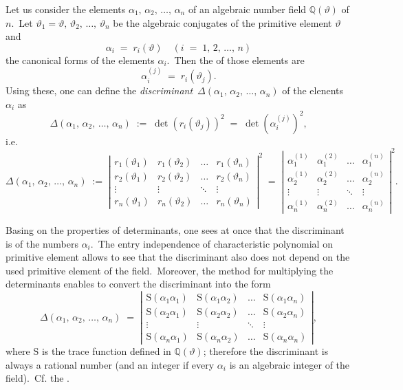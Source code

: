 \documentclass[12pt]{article}
\theoremstyle{definition}
\begin{document}
Let us consider the elements $\alpha_1,\,\alpha_2,\,\ldots,\,\alpha_n$ of an algebraic number field 
$\mathbb{Q}(\vartheta)$ of  $n$.\, Let 
$\vartheta_1 = \vartheta,\,\vartheta_2,\,\ldots,\,\vartheta_n$ be the algebraic conjugates of the primitive element $\vartheta$ and
$$\alpha_i \;=\; r_i(\vartheta) \quad (i \;=\; 1,\,2,\,\ldots,\,n)$$
the canonical forms of the elements $\alpha_i$.\, Then the  of those elements are
$$\alpha_i^{(j)} \;=\; r_i(\vartheta_j).$$
Using these, one can define the \emph{discriminant}\, $\Delta(\alpha_1,\,\alpha_2,\,\ldots,\,\alpha_n)$ of the elenents $\alpha_i$ as
$$\Delta(\alpha_1,\,\alpha_2,\,\ldots,\,\alpha_n) \;:=\; \det(r_i(\vartheta_j))^2 
\;=\; \det\!\left(\alpha_i^{(j)}\right)^2\!,$$
i.e. 
$$\Delta(\alpha_1,\,\alpha_2,\,\ldots,\,\alpha_n) \;:=\;
\left|\begin{array}{cccc}
r_1(\vartheta_1) & r_1(\vartheta_2) &\ldots & r_1(\vartheta_n)\\
r_2(\vartheta_1) & r_2(\vartheta_2) &\ldots & r_2(\vartheta_n)\\
\vdots & \vdots & \ddots & \vdots \\
r_n(\vartheta_1) & r_n(\vartheta_2) &\ldots & r_n(\vartheta_n)
\end{array}\right|^2 \;=\;
\left|\begin{array}{cccc}
\alpha_1^{(1)} & \alpha_1^{(2)} &\ldots & \alpha_1^{(n)}\\
\alpha_2^{(1)} & \alpha_2^{(2)} &\ldots & \alpha_2^{(n)}\\
\vdots & \vdots & \ddots & \vdots \\
\alpha_n^{(1)} & \alpha_n^{(2)} &\ldots & \alpha_n^{(n)}
\end{array}\right|^2\!.
$$

Basing on the properties of determinants, one sees at once that the discriminant is  of the numbers $\alpha_i$.\, The entry independence of characteristic polynomial on primitive element allows to see that the discriminant also does not depend on the used primitive element of the field.\, Moreover, the method for multiplying the determinants enables to convert the discriminant into the form
$$\Delta(\alpha_1,\,\alpha_2,\,\ldots,\,\alpha_n) \;=\;
\left|\begin{array}{cccc}
\mbox{S}(\alpha_1\alpha_1) & \mbox{S}(\alpha_1\alpha_2) &\ldots & \mbox{S}(\alpha_1\alpha_n)\\
\mbox{S}(\alpha_2\alpha_1) & \mbox{S}(\alpha_2\alpha_2) &\ldots & \mbox{S}(\alpha_2\alpha_n)\\
\vdots & \vdots & \ddots & \vdots \\
\mbox{S}(\alpha_n\alpha_1) & \mbox{S}(\alpha_n\alpha_2) &\ldots & \mbox{S}(\alpha_n\alpha_n)
\end{array}\right|\!,
$$
where $\mbox{S}$ is the trace function defined in $\mathbb{Q}(\vartheta)$; therefore the discriminant is always a rational number (and an integer if every $\alpha_i$ is an algebraic integer of the field).\, Cf. the .

\end{document}
